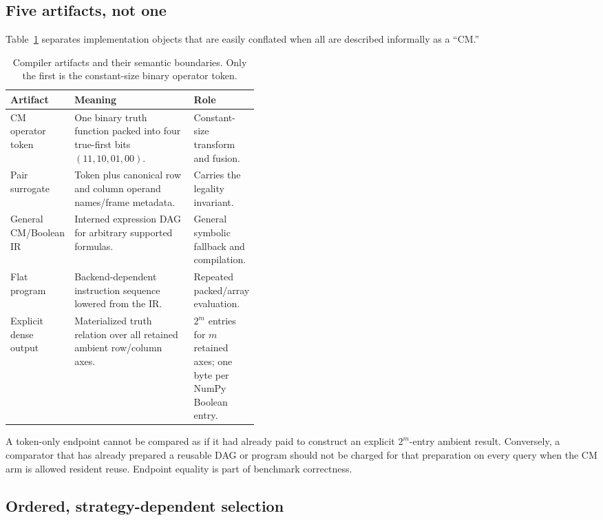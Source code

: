 \documentclass[10pt]{article}
\theoremstyle{plain}
\theoremstyle{definition}
\theoremstyle{remark}
\begin{document}
\subsection{Five artifacts, not one}

Table~\ref{tab:artifacts} separates implementation objects that are easily conflated when all are described informally as a ``CM.''

\begin{table}[t]
\centering
\small
\begin{tabularx}{\linewidth}{@{}>{\raggedright\arraybackslash}p{0.18\linewidth}>{\raggedright\arraybackslash}X >{\raggedright\arraybackslash}p{0.24\linewidth}@{}}
\toprule
\textbf{Artifact} & \textbf{Meaning} & \textbf{Role}\\
\midrule
CM operator token & One binary truth function packed into four true-first bits $(11,10,01,00)$. & Constant-size transform and fusion.\\
Pair surrogate & Token plus canonical row and column operand names/frame metadata. & Carries the legality invariant.\\
General CM/Boolean IR & Interned expression DAG for arbitrary supported formulas. & General symbolic fallback and compilation.\\
Flat program & Backend-dependent instruction sequence lowered from the IR. & Repeated packed/array evaluation.\\
Explicit dense output & Materialized truth relation over all retained ambient row/column axes. & $2^m$ entries for $m$ retained axes; one byte per NumPy Boolean entry.\\
\bottomrule
\end{tabularx}
\caption{Compiler artifacts and their semantic boundaries. Only the first is the constant-size binary operator token.}
\label{tab:artifacts}
\end{table}

A token-only endpoint cannot be compared as if it had already paid to construct an explicit $2^m$-entry ambient result. Conversely, a comparator that has already prepared a reusable DAG or program should not be charged for that preparation on every query when the CM arm is allowed resident reuse. Endpoint equality is part of benchmark correctness.

\subsection{Ordered, strategy-dependent selection}
\label{sec:selection}
\end{document}
